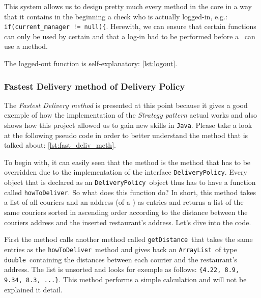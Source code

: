 This system allows us to design pretty much every method in the core in a way that it contains in the beginning a check who is actually logged-in, e.g.: \lstinline|if(current_manager != null){|. Herewith, we can ensure that certain functions can only be used by certain \User and that a log-in had to be performed before a \User~can use a method.

The logged-out function is self-explanatory: \ref{lst:logout}.


\subsubsection{Fastest Delivery method of Delivery Policy} %
\label{ssub:fastest_delivery_method_of_delivery_policy}

The \emph{Fastest Delivery method} is presented at this point because it gives a good exemple of how the implementation of the \emph{Strategy pattern} actual works and also shows how this project allowed us to gain new skills in \lstinline|Java|. Please take a look at the following pseudo code in order to better understand the method that is talked about: 
\ref{lst:fast_deliv_meth}. 

To begin with, it can easily seen that the method is the method that has to be overridden due to the implementation of the interface \lstinline|DeliveryPolicy|. Every object that is declared as an \lstinline|DeliveryPolicy|~object thus has to have a function called \lstinline|howToDeliver|. So what does this function do? In short, this method takes a list of all couriers and an address (of a \Restaurant) as entries and returns a list of the same couriers sorted in ascending order according to the distance between the couriers address and the inserted restaurant's address. Let's dive into the code.

First the method calls another method called \lstinline|getDistance|~that takes the same entries as the \lstinline|howToDeliver|~method and gives back an \lstinline|ArrayList|~of type \lstinline|double|~containing the distances between each courier and the restaurant's address. The list is unsorted and looks for exemple as follows: \lstinline|{4.22, 8.9, 9.34, 8.3, ...}|. This method performs a simple calculation and will not be explained it detail.

